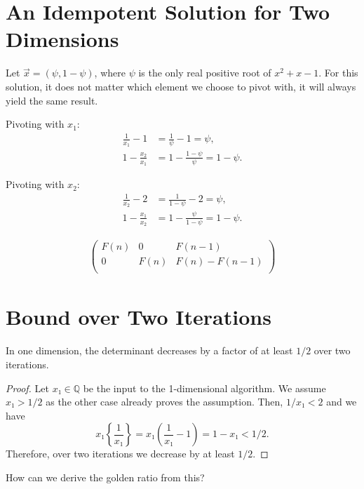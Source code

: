 \documentclass[english,version-2020-11]{uzl-thesis}
\begin{document}
\section{An Idempotent Solution for Two Dimensions}

Let $\vec x = (\psi, 1 - \psi)$, where $\psi$ is the only real positive root of $x^2 + x - 1$.
For this solution, it does not matter which element we choose to pivot with, it will always
yield the same result.

Pivoting with $x_1$:
\begin{align*}
  \frac{1}{x_1} - 1 & = \frac{1}{\psi} - 1 = \psi, \\
  1 - \frac{x_2}{x_1} & = 1 - \frac{1 - \psi}{\psi} = 1 - \psi.
\end{align*}

Pivoting with $x_2$:
\begin{align*}
  \frac{1}{x_2} - 2 & = \frac{1}{1 - \psi} - 2 = \psi, \\
  1 - \frac{x_1}{x_2} & = 1 - \frac{\psi}{1 - \psi} = 1 - \psi.
\end{align*}

\begin{align*}
  \left(
  \begin{array}{cc|c}
    F(n) & 0    & F(n-1) \\
    0    & F(n) & F(n) - F(n-1) \\
  \end{array}
  \right)
\end{align*}

\section{Bound over Two Iterations}

\begin{proposition}
  In one dimension, the determinant decreases by a factor of at least $1/2$ over
  two iterations.
\end{proposition}

\begin{proof}
  Let $x₁ ∈ ℚ$ be the input to the 1-dimensional algorithm.
  We assume $x₁ > 1/2$ as the other case already proves the assumption.
  Then, $1/x₁ < 2$ and we have
  $$
    x₁ \left\{\frac{1}{x₁}\right\}
    = x₁ \left(\frac{1}{x₁} - 1\right)
    = 1 - x₁ < 1/2.
    $$
  Therefore, over two iterations we decrease by at least $1/2$.
\end{proof}

How can we derive the golden ratio from this?
\end{document}
